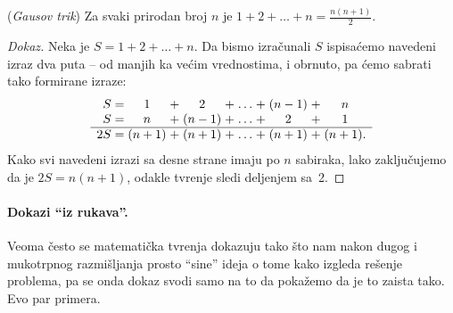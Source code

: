  \begin{EX}\label{ft05.ex.gausov-trik} (\emph{Gausov trik})
   Za svaki prirodan broj $n$ je $\displaystyle 1 + 2 + \ldots + n = \frac{n(n+1)}{2}$.
 \end{EX}
 \begin{proof}[Dokaz]
   Neka je $S = 1 + 2 + \ldots + n$. Da bismo izra\v cunali $S$ ispisa\'cemo navedeni izraz dva puta -- od manjih ka
   ve\'cim vrednostima, i obrnuto, pa \'cemo sabrati tako formirane izraze:
   $$
   \begin{array}{r@{\;}c@{\;}c@{\;}c@{\;}c@{\;}c@{\;}c@{\;}c@{\;}c@{\;}c@{\;}c}
     S &= &1 &+ &2     &+ &\ldots &+ &(n - 1) &+ &n\\
     S &= &n &+ &(n-1) &+ &\ldots &+ &2       &+ &1\\
     \hline
     2S &= &(n+1) &+ &(n+1) &+ &\ldots &+ &(n+1) &+ &(n+1).
   \end{array}
   $$
   Kako svi navedeni izrazi sa desne strane imaju po $n$ sabiraka, lako zaklju\v cujemo da je
   $2S = n(n+1)$, odakle tvr\dj enje sledi deljenjem sa~2.
 \end{proof}
 
 




\paragraph{Dokazi \enquote{iz rukava}.}
Veoma \v cesto se matemati\v cka tvr\dj enja dokazuju tako \v sto nam nakon dugog i mukotrpnog razmi\v sljanja
prosto \enquote{sine} ideja o tome kako izgleda re\v senje problema, pa se onda dokaz svodi samo na to da poka\v zemo
da je to zaista tako. Evo par primera.


